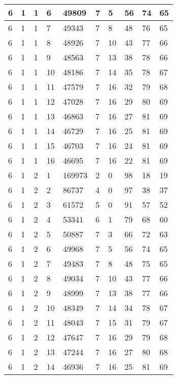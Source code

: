 \begin{table}[!ht]
\begin{tabular}{|l|l|l|l|l|l|l|l|l|l|}
        6 & 1 & 1 & 6 & 49809 & 7 & 5 & 56 & 74 & 65 \\ \hline
        6 & 1 & 1 & 7 & 49343 & 7 & 8 & 48 & 76 & 65 \\ \hline
        6 & 1 & 1 & 8 & 48926 & 7 & 10 & 43 & 77 & 66 \\ \hline
        6 & 1 & 1 & 9 & 48563 & 7 & 13 & 38 & 78 & 66 \\ \hline
        6 & 1 & 1 & 10 & 48186 & 7 & 14 & 35 & 78 & 67 \\ \hline
        6 & 1 & 1 & 11 & 47579 & 7 & 16 & 32 & 79 & 68 \\ \hline
        6 & 1 & 1 & 12 & 47028 & 7 & 16 & 29 & 80 & 69 \\ \hline
        6 & 1 & 1 & 13 & 46863 & 7 & 16 & 27 & 81 & 69 \\ \hline
        6 & 1 & 1 & 14 & 46729 & 7 & 16 & 25 & 81 & 69 \\ \hline
        6 & 1 & 1 & 15 & 46703 & 7 & 16 & 24 & 81 & 69 \\ \hline
        6 & 1 & 1 & 16 & 46695 & 7 & 16 & 22 & 81 & 69 \\ \hline
        6 & 1 & 2 & 1 & 169973 & 2 & 0 & 98 & 18 & 19 \\ \hline
        6 & 1 & 2 & 2 & 86737 & 4 & 0 & 97 & 38 & 37 \\ \hline
        6 & 1 & 2 & 3 & 61572 & 5 & 0 & 91 & 57 & 52 \\ \hline
        6 & 1 & 2 & 4 & 53341 & 6 & 1 & 79 & 68 & 60 \\ \hline
        6 & 1 & 2 & 5 & 50887 & 7 & 3 & 66 & 72 & 63 \\ \hline
        6 & 1 & 2 & 6 & 49968 & 7 & 5 & 56 & 74 & 65 \\ \hline
        6 & 1 & 2 & 7 & 49483 & 7 & 8 & 48 & 75 & 65 \\ \hline
        6 & 1 & 2 & 8 & 49034 & 7 & 10 & 43 & 77 & 66 \\ \hline
        6 & 1 & 2 & 9 & 48999 & 7 & 13 & 38 & 77 & 66 \\ \hline
        6 & 1 & 2 & 10 & 48349 & 7 & 14 & 34 & 78 & 67 \\ \hline
        6 & 1 & 2 & 11 & 48043 & 7 & 15 & 31 & 79 & 67 \\ \hline
        6 & 1 & 2 & 12 & 47647 & 7 & 16 & 29 & 79 & 68 \\ \hline
        6 & 1 & 2 & 13 & 47244 & 7 & 16 & 27 & 80 & 68 \\ \hline
        6 & 1 & 2 & 14 & 46936 & 7 & 16 & 25 & 81 & 69 \\ \hline

\end{tabular}
\end{table}
